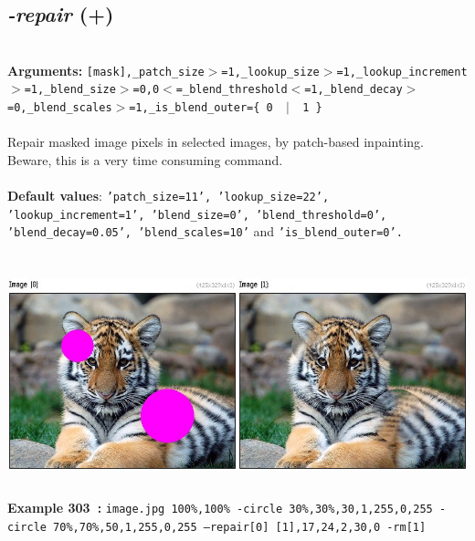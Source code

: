 \documentclass[a4paper,11pt,twoside]{book}
\begin{document}
\subsection{\emph{-repair} (+)}\vspace*{-0.5em}
~\\\textbf{Arguments: } 
{\small \texttt{[mask],\_patch\_size$>$=1,\_lookup\_size$>$=1,\_lookup\_increment$>$=1,\_blend\_size$>$=0,0$<$=\_blend\_threshold$<$=1,\_blend\_decay$>$=0,\_blend\_scales$>$=1,\_is\_blend\_outer=\{ 0 ~$|$~ 1 \}}}\\~\\
Repair masked image pixels in selected images, by patch-based inpainting.
~\\Beware, this is a very time consuming command.
~\\~\\\textbf{Default values}: {\small \texttt{'patch\_size=11', 'lookup\_size=22', 'lookup\_increment=1', 'blend\_size=0', 'blend\_threshold=0', 'blend\_decay=0.05', 'blend\_scales=10'} and \texttt{'is\_blend\_outer=0'.}}
\begin{center}\includegraphics[keepaspectratio=true,height=7cm,width=\textwidth]{img/gmic_def303.jpg}\\
{\footnotesize \textbf{Example 303~:} \texttt{image.jpg 100\%,100\% -circle 30\%,30\%,30,1,255,0,255 -circle 70\%,70\%,50,1,255,0,255 --repair[0] [1],17,24,2,30,0 -rm[1]}}
\end{center}
\end{document}
